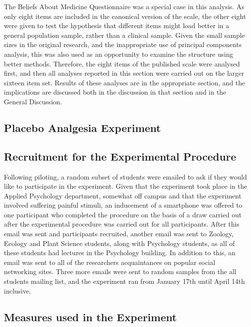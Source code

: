 The Beliefs About Medicine Questionnaire was a special case in this analysis. As only eight items are included in the canonical version of the scale, the other eight were given to test the hypothesis that different items might load better in a general population sample, rather than a clinical sample. Given the small sample sizes in the original research, and the inappropriate use of principal components analysis, this was also used as an opportunity to examine the structure using better methods. Therefore, the eight items of the published scale were analysed first, and then all analyses reported in this section were carried out on the larger sixteen item set. Results of these analyses are in the appropriate section, and the implications are discussed both in the discussion in that section and in the General Discussion.


\subsection{Placebo Analgesia Experiment}

\subsection{Recruitment for the Experimental Procedure}

Following piloting, a random subset of students were emailed to ask if they would like to participate in the experiment. Given that the experiment took place in the Applied Psychology department, somewhat off campus and that the experiment involved suffering painful stimuli, an inducement of a smartphone was offered to one participant who completed the procedure on the basis of a draw carried out after the experimental procedure was carried out for all participants.  After this email was sent and participants recruited, another email was sent to Zoology, Ecology and Plant Science students, along with Psychology students, as all of these students had lectures in the Psychology building. In addition to this, an email was sent to all of the researchers acquaintances on popular social networking sites. Three more emails were sent to random samples from the all students mailing list, and the experiment ran from January 17th until April 14th inclusive.

\subsection{Measures used in the Experiment}
\label{sec:meas-used-exper}

